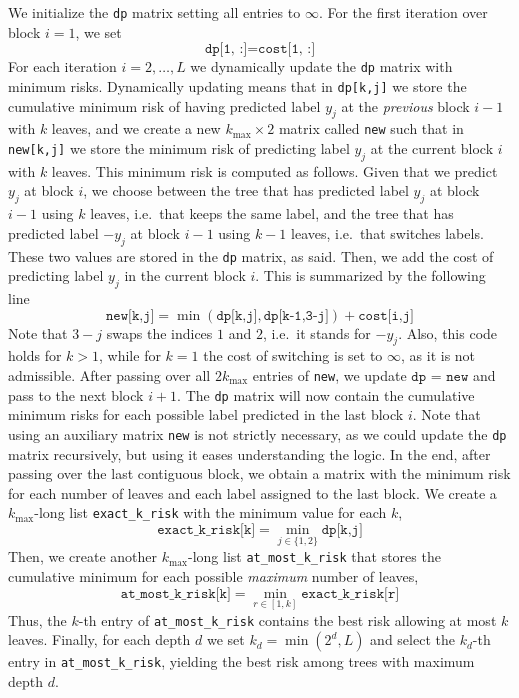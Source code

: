 We initialize the \texttt{dp} matrix setting all entries to $\infty$. For the first iteration over block $i=1$, we set \[\texttt{dp[1, :]} = \texttt{cost[1, :]}\] For each iteration $i=2,\ldots,L$ we dynamically update the \texttt{dp} matrix with minimum risks. Dynamically updating means that in \texttt{dp[k,j]} we store the cumulative minimum risk of having predicted label $y_j$ at the {\it previous\/} block $i-1$ with $k$ leaves, and we create a new $k_{\max}\times 2$ matrix called \texttt{new} such that in \texttt{new[k,j]} we store the minimum risk of predicting label $y_j$ at the current block $i$ with $k$ leaves. This minimum risk is computed as follows. Given that we predict $y_j$ at block $i$, we choose between the tree that has predicted label $y_j$ at block $i-1$ using $k$ leaves, i.e.\ that keeps the same label, and the tree that has predicted label $-y_j$ at block $i-1$ using $k-1$ leaves, i.e.\ that switches labels. These two values are stored in the \texttt{dp} matrix, as said. Then, we add the cost of predicting label $y_j$ in the current block $i$. This is summarized by the following line
\[
\texttt{new[k,j]} = \min(\texttt{dp[k,j]}, \texttt{dp[k-1,3-j]}) + \texttt{cost[i,j]}
\]
Note that $3-j$ swaps the indices $1$ and $2$, i.e.\ it stands for $-y_j$. Also, this code holds for $k>1$, while for $k = 1$ the cost of switching is set to $\infty$, as it is not admissible. 
After passing over all $2k_{\max}$ entries of \texttt{new}, we update $\texttt{dp = new}$ and pass to the next block $i+1$. The \texttt{dp} matrix will now contain the cumulative minimum risks for each possible label predicted in the last block $i$. Note that using an auxiliary matrix \texttt{new} is not strictly necessary, as we could update the \texttt{dp} matrix recursively, but using it eases understanding the logic. 
In the end, after passing over the last contiguous block, we obtain a matrix with the minimum risk for each number of leaves and each label assigned to the last block. We create a $k_{\max}$-long list \texttt{exact\_k\_risk} with the minimum value for each $k$,
\[
\texttt{exact\_k\_risk[k]} = \min_{j \in\{1,2\}} \texttt{dp[k,j]}
\]
Then, we create another $k_{\max}$-long list \texttt{at\_most\_k\_risk} that stores the cumulative minimum for each possible {\it maximum} number of leaves, 
\[
\texttt{at\_most\_k\_risk[k]} = \min_{r \in[1,k]} \texttt{exact\_k\_risk[r]}
\]
Thus, the $k$-th entry of \texttt{at\_most\_k\_risk} contains the best risk allowing at most $k$ leaves. Finally, for each depth $d$ we set $k_d = \min(2^d, L)$ and select the $k_d$-th entry in \texttt{at\_most\_k\_risk}, yielding the best risk among trees with maximum depth $d$.
